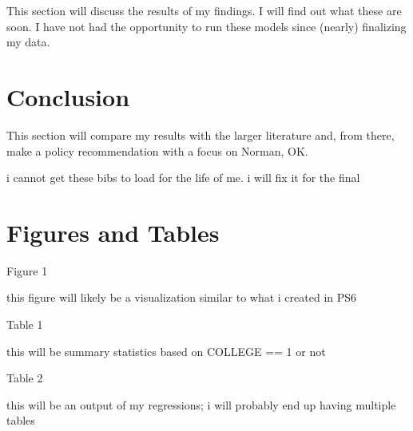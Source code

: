 \documentclass[12pt,english]{article}
\begin{document}
This section will discuss the results of my findings. I will find out what these are soon. I have not had the opportunity to run these models since (nearly) finalizing my data.


\section{Conclusion}\label{sec:conclusion}

This section will compare my results with the larger literature and, from there, make a policy recommendation with a focus on Norman, OK.

\vfill
\pagebreak{}
\begin{spacing}{1.0}



i cannot get these bibs to load for the life of me. i will fix it for the final
\end{spacing}

\vfill
\pagebreak{}


\section*{Figures and Tables}\label{sec:figTables}
Figure 1

this figure will likely be a visualization similar to what i created in PS6


Table 1

this will be summary statistics based on COLLEGE == 1 or not


Table 2

this will be an output of my regressions; i will probably end up having multiple tables
\end{document}
